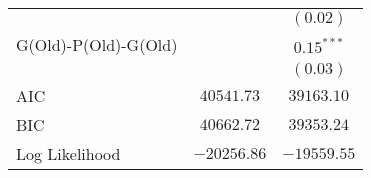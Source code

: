\begin{center}
\begin{longtable}{l c c}
                                       &               & $(0.02)$      \\
G(Old)-P(Old)-G(Old)                   &               & $0.15^{***}$  \\
                                       &               & $(0.03)$      \\
\midrule
AIC                                    & $40541.73$    & $39163.10$    \\
BIC                                    & $40662.72$    & $39353.24$    \\
Log Likelihood                         & $-20256.86$   & $-19559.55$   \\
\end{longtable}
\end{center}
